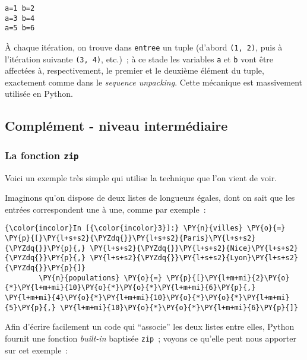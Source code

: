     \begin{Verbatim}[commandchars=\\\{\},frame=single,framerule=0.3mm,rulecolor=\color{cellframecolor}]
a=1 b=2
a=3 b=4
a=5 b=6
\end{Verbatim}

    À chaque itération, on trouve dans \texttt{entree} un tuple (d'abord
\texttt{(1,\ 2)}, puis à l'itération suivante \texttt{(3,\ 4)}, etc.)~;
à ce stade les variables \texttt{a} et \texttt{b} vont être affectées à,
respectivement, le premier et le deuxième élément du tuple, exactement
comme dans le \emph{sequence unpacking}. Cette mécanique est massivement
utilisée en Python.

    \hypertarget{compluxe9ment---niveau-intermuxe9diaire}{%
\subsection{Complément - niveau
intermédiaire}\label{compluxe9ment---niveau-intermuxe9diaire}}

    \hypertarget{la-fonction-zip}{%
\subsubsection{\texorpdfstring{La fonction
\texttt{zip}}{La fonction zip}}\label{la-fonction-zip}}

    Voici un exemple très simple qui utilise la technique que l'on vient de
voir.

    Imaginons qu'on dispose de deux listes de longueurs égales, dont on sait
que les entrées correspondent une à une, comme par exemple~:

    \begin{Verbatim}[commandchars=\\\{\},frame=single,framerule=0.3mm,rulecolor=\color{cellframecolor}]
{\color{incolor}In [{\color{incolor}3}]:} \PY{n}{villes} \PY{o}{=} \PY{p}{[}\PY{l+s+s2}{\PYZdq{}}\PY{l+s+s2}{Paris}\PY{l+s+s2}{\PYZdq{}}\PY{p}{,} \PY{l+s+s2}{\PYZdq{}}\PY{l+s+s2}{Nice}\PY{l+s+s2}{\PYZdq{}}\PY{p}{,} \PY{l+s+s2}{\PYZdq{}}\PY{l+s+s2}{Lyon}\PY{l+s+s2}{\PYZdq{}}\PY{p}{]}
        \PY{n}{populations} \PY{o}{=} \PY{p}{[}\PY{l+m+mi}{2}\PY{o}{*}\PY{l+m+mi}{10}\PY{o}{*}\PY{o}{*}\PY{l+m+mi}{6}\PY{p}{,} \PY{l+m+mi}{4}\PY{o}{*}\PY{l+m+mi}{10}\PY{o}{*}\PY{o}{*}\PY{l+m+mi}{5}\PY{p}{,} \PY{l+m+mi}{10}\PY{o}{*}\PY{o}{*}\PY{l+m+mi}{6}\PY{p}{]}
\end{Verbatim}


    Afin d'écrire facilement un code qui ``associe'' les deux listes entre
elles, Python fournit une fonction \emph{built-in} baptisée
\texttt{zip}~; voyons ce qu'elle peut nous apporter sur cet exemple~:

